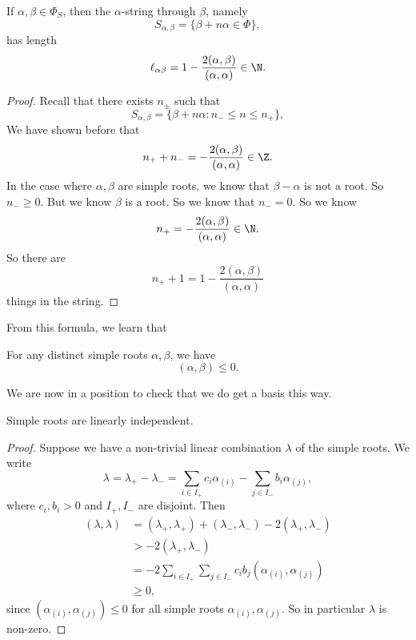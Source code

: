 \documentclass[a4paper]{article}
\begin{document}
\begin{prop}
  If $\alpha, \beta \in \Phi_S$, then the $\alpha$-string through $\beta$, namely
  \[
    S_{\alpha, \beta} = \{\beta + n \alpha \in \Phi\},
  \]
  has length
  \[
    \ell_{\alpha\beta} = 1 - \frac{2 (\alpha, \beta)}{(\alpha, \alpha)} \in \N.
  \]
\end{prop}

\begin{proof}
  Recall that there exists $n_{\pm}$ such that
  \[
    S_{\alpha, \beta} = \{\beta + n \alpha: n_- \leq n \leq n_+\},
  \]
  We have shown before that
  \[
    n_+ + n_- = - \frac{2(\alpha, \beta)}{(\alpha, \alpha)} \in \Z.
  \]
  In the case where $\alpha, \beta$ are simple roots, we know that $\beta - \alpha$ is not a root. So $n_- \geq 0$. But we know $\beta$ is a root. So we know that $n_- = 0$. So we know
  \[
    n_+ = -\frac{2(\alpha, \beta)}{(\alpha, \alpha)} \in \N.
  \]
  So there are
  \[
    n_+ + 1 = 1 - \frac{2(\alpha, \beta)}{(\alpha, \alpha)}
  \]
  things in the string.
\end{proof}
From this formula, we learn that

\begin{cor}
  For any distinct simple roots $\alpha, \beta$, we have
  \[
    (\alpha, \beta) \leq 0.
  \]
\end{cor}

We are now in a position to check that we do get a basis this way.

\begin{prop}
  Simple roots are linearly independent.
\end{prop}

\begin{proof}
  Suppose we have a non-trivial linear combination $\lambda$ of the simple roots. We write
  \[
    \lambda = \lambda_+ - \lambda_- = \sum_{i \in I_+} c_i \alpha_{(i)} - \sum_{j \in I_-} b_i \alpha_{(j)},
  \]
  where $c_i, b_i > 0$ and $I_+, I_-$ are disjoint. Then
  \begin{align*}
    (\lambda, \lambda) &= (\lambda_+, \lambda_+) + (\lambda_-, \lambda_-) - 2 (\lambda_+, \lambda_-)\\
    &> -2(\lambda_+, \lambda_-)\\
    &= -2 \sum_{i \in I_+}\sum_{j \in I_-} c_i b_j (\alpha_{(i)}, \alpha_{(j)})\\
    &\geq 0,
  \end{align*}
  since $(\alpha_{(i)}, \alpha_{(j)}) \leq 0$ for all simple roots $\alpha_{(i)}, \alpha_{(j)}$. So in particular $\lambda$ is non-zero.
\end{proof}
\end{document}
